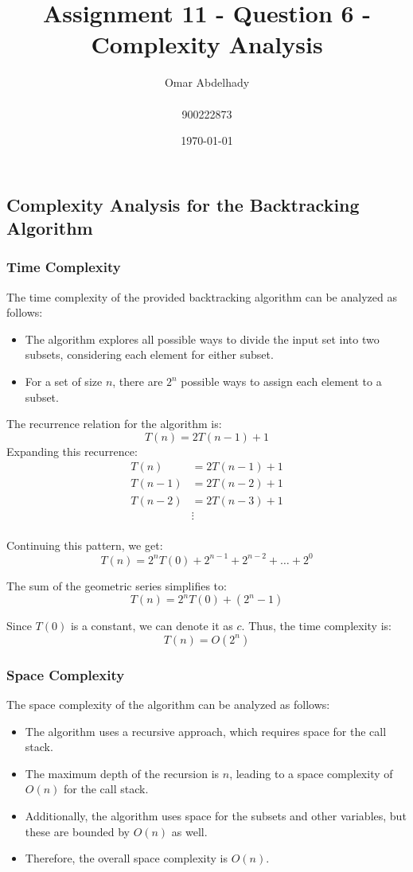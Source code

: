 \documentclass{article}
\title{Assignment 11 - Question 6 - Complexity Analysis}
\author{Omar Abdelhady \\ \\900222873}
\date{\today}
\begin{document}
\maketitle

\newpage

\subsection*{Complexity Analysis for the Backtracking Algorithm}
\subsubsection*{Time Complexity}

The time complexity of the provided backtracking algorithm can be analyzed as follows:

\begin{itemize}
    \item The algorithm explores all possible ways to divide the input set into two subsets, considering each element for either subset.
    \item For a set of size $n$, there are $2^n$ possible ways to assign each element to a subset.
\end{itemize}

The recurrence relation for the algorithm is:
\[
T(n) = 2T(n-1) + 1
\]
Expanding this recurrence:
\begin{align*}
T(n) &= 2T(n-1) + 1 \\
T(n-1) &= 2T(n-2) + 1 \\
T(n-2) &= 2T(n-3) + 1 \\
&\vdots \\
\end{align*}

Continuing this pattern, we get:
\[
T(n) = 2^n T(0) + 2^{n-1} + 2^{n-2} + \ldots + 2^0
\]

The sum of the geometric series simplifies to:
\[
T(n) = 2^n T(0) + (2^n - 1)
\]

Since $T(0)$ is a constant, we can denote it as $c$. Thus, the time complexity is:
\[
T(n) = O(2^n)
\]

\subsubsection*{Space Complexity}
The space complexity of the algorithm can be analyzed as follows:
\begin{itemize}
    \item The algorithm uses a recursive approach, which requires space for the call stack.
    \item The maximum depth of the recursion is $n$, leading to a space complexity of $O(n)$ for the call stack.
    \item Additionally, the algorithm uses space for the subsets and other variables, but these are bounded by $O(n)$ as well.
    \item Therefore, the overall space complexity is $O(n)$.
\end{itemize}
\end{document}
